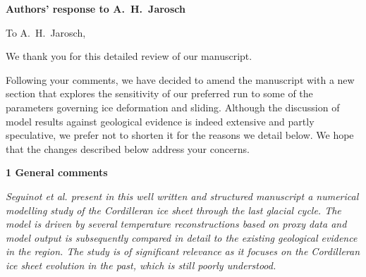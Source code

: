 


\textbf{Authors' response to A.~H.~Jarosch}
\bigskip


\newcommand{\doi}[1]{doi:\allowbreak\href{http://dx.doi.org/#1}{#1}}
\newcommand{\degree}[0]{\ensuremath{^{\circ}}}
\newcommand{\tophline}{\noalign{\vspace{1ex}}\hline\noalign{\vspace{1mm}}}
\newcommand{\middlehline}{\noalign{\vspace{1mm}}\hline\noalign{\vspace{1mm}}}
\newcommand{\bottomhline}{\noalign{\vspace{1mm}}\hline}
\newcommand{\belowtable}[1]{\par\vspace{1ex}\raggedleft{\scriptsize#1}}

\renewcommand{\vec}[1]{\ensuremath{\mbox{\boldmath$#1$}}}

\newcommand{\sechead}[1]{\bigskip\noindent\textbf{#1}}
\newcommand{\referee}[1]{\bigskip\textcolor{journalname}{\textit{#1}}}
\newcommand{\msquote}[1]{\begin{quote}\textit{#1}\end{quote}}

To A.~H.~Jarosch,

We thank you for this detailed review of our manuscript.

Following your comments, we have decided to amend the manuscript with a new
section that explores the sensitivity of our preferred run to some of the
parameters governing ice deformation and sliding. Although the discussion of
model results against geological evidence is indeed extensive and partly
speculative, we prefer not to shorten it for the reasons we detail below.
We hope that the changes described below address your concerns.


\sechead{1 \quad General comments}

\referee{%
    Seguinot et al. present in this well written and structured manuscript a
    numerical modelling study of the Cordilleran ice sheet through the last
    glacial cycle. The model is driven by several temperature reconstructions
    based on proxy data and model output is subsequently compared in detail to
    the existing geological evidence in the region. The study is of significant
    relevance as it focuses on the Cordilleran ice sheet evolution in the past,
    which is still poorly understood.}

